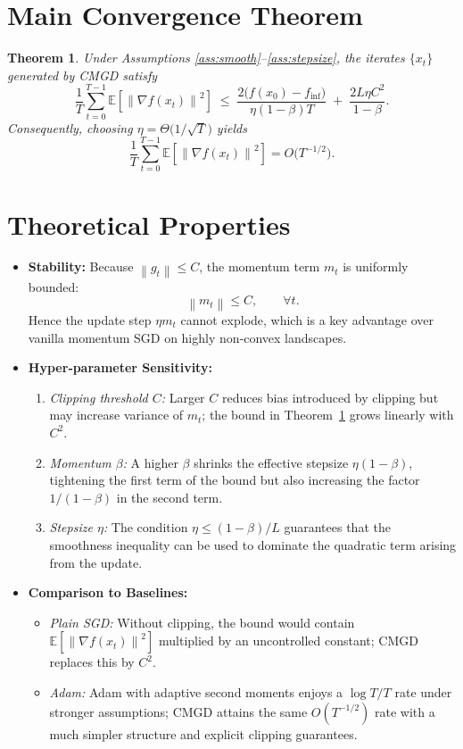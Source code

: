 \documentclass{article}
\newtheorem{theorem}{Theorem}
\newcommand{\E}{\mathbb{E}}
\newcommand{\norm}[1]{\left\lVert #1\right\rVert}
\newcommand{\grad}{\nabla}
\begin{document}
\section*{Main Convergence Theorem}
\begin{theorem}\label{thm:main}
Under Assumptions \ref{ass:smooth}–\ref{ass:stepsize}, the iterates $\{x_t\}$ generated by CMGD satisfy
\[
\frac{1}{T}\sum_{t=0}^{T-1}\E\!\left[\norm{\grad f(x_t)}^2\right]
\;\le\;
\frac{2\bigl(f(x_0)-f_{\inf}\bigr)}{\eta(1-\beta)T}
\;+\;
\frac{2L\eta C^2}{1-\beta}.
\]
Consequently, choosing $\eta = \Theta\!\bigl(1/\sqrt{T}\bigr)$ yields
\[
\frac{1}{T}\sum_{t=0}^{T-1}\E\!\left[\norm{\grad f(x_t)}^2\right]
= O\!\bigl(T^{-1/2}\bigr).
\]
\end{theorem}

\section*{Theoretical Properties}
\begin{itemize}
\item \textbf{Stability:} Because $\norm{g_t}\le C$, the momentum term $m_t$ is uniformly bounded:
\[
\norm{m_t}\le C,\qquad\forall t.
\]
Hence the update step $\eta m_t$ cannot explode, which is a key advantage over vanilla momentum SGD on highly non‑convex landscapes.
\item \textbf{Hyper‑parameter Sensitivity:}
\begin{enumerate}[label=\alph*)]
\item \emph{Clipping threshold $C$:} Larger $C$ reduces bias introduced by clipping but may increase variance of $m_t$; the bound in Theorem~\ref{thm:main} grows linearly with $C^2$.
\item \emph{Momentum $\beta$:} A higher $\beta$ shrinks the effective stepsize $\eta(1-\beta)$, tightening the first term of the bound but also increasing the factor $1/(1-\beta)$ in the second term.
\item \emph{Stepsize $\eta$:} The condition $\eta\le (1-\beta)/L$ guarantees that the smoothness inequality can be used to dominate the quadratic term arising from the update.
\end{enumerate}
\item \textbf{Comparison to Baselines:}
\begin{itemize}
\item \emph{Plain SGD:} Without clipping, the bound would contain $\E[\norm{\grad f(x_t)}^2]$ multiplied by an uncontrolled constant; CMGD replaces this by $C^2$.
\item \emph{Adam:} Adam with adaptive second moments enjoys a $\log T/T$ rate under stronger assumptions; CMGD attains the same $O(T^{-1/2})$ rate with a much simpler structure and explicit clipping guarantees.
\end{itemize}
\end{itemize}
\end{document}

